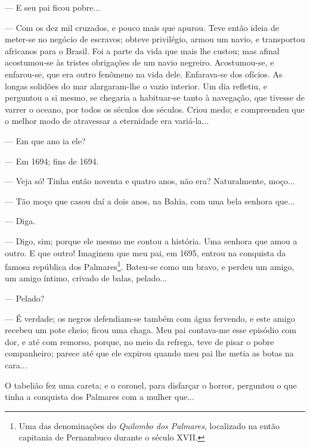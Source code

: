 --- E seu pai ficou pobre...

--- Com os dez mil cruzados, e pouco mais que apurou. Teve então ideia
de meter-se no negócio de escravos; obteve privilégio, armou um navio, e
transportou africanos para o Brasil. Foi a parte da vida que mais lhe
custou; mas afinal acostumou-se às tristes obrigações de um navio
negreiro. Acostumou-se, e enfarou-se, que era outro fenômeno na vida
dele. Enfarava-se dos ofícios. As longas solidões do mar alargaram-lhe o
vazio interior. Um dia refletiu, e perguntou a si mesmo, se chegaria a
habituar-se tanto à navegação, que tivesse de varrer o oceano, por todos
os séculos dos séculos. Criou medo; e compreendeu que o melhor modo de
atravessar a eternidade era variá-la...

--- Em que ano ia ele?

--- Em 1694; fins de 1694.

--- Veja só! Tinha então noventa e quatro anos, não era? Naturalmente,
moço...

--- Tão moço que casou daí a dois anos, na Bahia, com uma bela senhora
que...

--- Diga.

--- Digo, sim; porque ele mesmo me contou a história. Uma senhora que
amou a outro. E que outro! Imaginem que meu pai, em 1695, entrou na
conquista da famosa república dos Palmares\footnote{Uma das denominações
  do \emph{Quilombo dos Palmares}, localizado na então capitania de
  Pernambuco durante o século XVII.}. Bateu-se como um bravo, e perdeu
um amigo, um amigo íntimo, crivado de balas, pelado...

--- Pelado?

--- É verdade; os negros defendiam-se também com água fervendo, e este
amigo recebeu um pote cheio; ficou uma chaga. Meu pai contava-me esse
episódio com dor, e até com remorso, porque, no meio da refrega, teve de
pisar o pobre companheiro; parece até que ele expirou quando meu pai lhe
metia as botas na cara...

O tabelião fez uma careta; e o coronel, para disfarçar o horror,
perguntou o que tinha a conquista dos Palmares com a mulher que...

